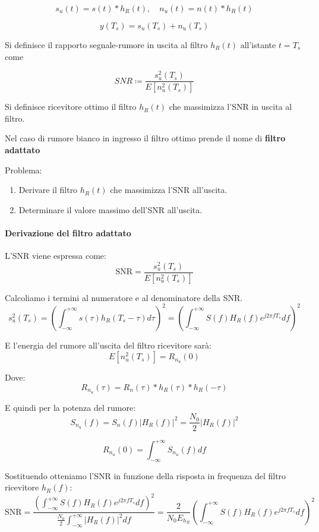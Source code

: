 \[
    s_u(t) = s(t) \ast h_R(t), \quad n_u(t) = n(t) \ast h_R(t)
\]

\[
    y(T_s) = s_u(T_s) + n_u(T_s)
\]

Si definisce il rapporto segnale-rumore in uscita al filtro \( h_R(t) \) all'istante \( t = T_s \) come

\[
    SNR \coloneqq \frac{s_u^2(T_s)}{E[n_u^2(T_s)]}
\]

Si definisce ricevitore ottimo il filtro \( h_R(t) \) che massimizza l'SNR in uscita al filtro.

Nel caso di rumore bianco in ingresso il filtro ottimo prende il nome di \textbf{filtro adattato}

Problema:
\begin{enumerate}
    \item Derivare il filtro \( h_R(t) \) che massimizza l'SNR all'uscita.
    \item Determinare il valore massimo dell'SNR all'uscita.
\end{enumerate}


\paragraph*{Derivazione del filtro adattato}

L'SNR viene espressa come:
\[
    \text{SNR} = \frac{s_u^2(T_s)}{E[n_u^2(T_s)]}
\]

Calcoliamo i termini al numeratore e al denominatore della SNR.
\[
    s_u^2(T_s) = \left( \int_{-\infty}^{+\infty} s(\tau) h_R(T_s - \tau) d\tau \right)^2 = \left( \int_{-\infty}^{+\infty} S(f) H_R(f) e^{j2\pi fT_s} df \right)^2
\]

E l'energia del rumore all'uscita del filtro ricevitore sarà:
\[
    E[n_u^2(T_s)] = R_{n_u}(0)
\]

Dove:
\[
    R_{n_u}(\tau) = R_n(\tau) \ast h_R(\tau) \ast h_R(-\tau)
\]

E quindi per la potenza del rumore:
\[
    S_{n_u}(f) = S_n(f) \left| H_R(f) \right|^2 = \frac{N_0}{2} \left| H_R(f) \right|^2
\]

\[
    R_{n_u}(0) = \int_{-\infty}^{+\infty} S_{n_u}(f) df
\]

Sostituendo otteniamo l'SNR in funzione della risposta in frequenza del filtro ricevitore \( h_R(f) \):
\[
    \text{SNR} = \frac{\left( \int_{-\infty}^{+\infty} S(f) H_R(f) e^{j2\pi fT_s} df \right)^2}{\frac{N_0}{2} \int_{-\infty}^{+\infty} \left| H_R(f) \right|^2 df} = \frac{2}{N_0 E_{h_R}} \left( \int_{-\infty}^{+\infty} S(f) H_R(f) e^{j2\pi fT_s} df \right)^2
\]

